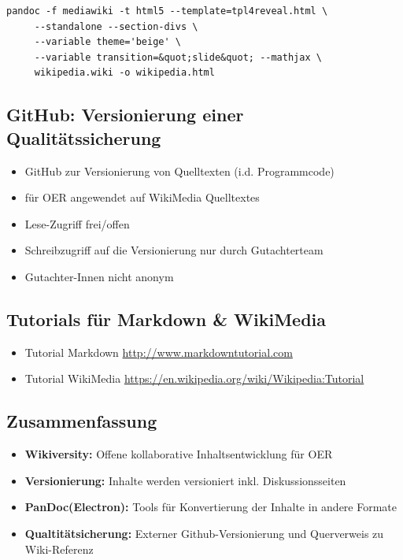 \documentclass[]{article}
\providecommand{\tightlist}{%
  \setlength{\itemsep}{0pt}\setlength{\parskip}{0pt}}
\begin{document}
\begin{verbatim}
pandoc -f mediawiki -t html5 --template=tpl4reveal.html \
     --standalone --section-divs \
     --variable theme='beige' \
     --variable transition=&quot;slide&quot; --mathjax \
     wikipedia.wiki -o wikipedia.html
\end{verbatim}

\subsection{GitHub: Versionierung einer
Qualitätssicherung}\label{github-versionierung-einer-qualituxe4tssicherung}

\begin{itemize}
\tightlist
\item
  GitHub zur Versionierung von Quelltexten (i.d. Programmcode)
\item
  für OER angewendet auf WikiMedia Quelltextes
\item
  Lese-Zugriff frei/offen
\item
  Schreibzugriff auf die Versionierung nur durch Gutachterteam
\item
  Gutachter-Innen nicht anonym
\end{itemize}

\subsection{Tutorials für Markdown \&
WikiMedia}\label{tutorials-fuxfcr-markdown-wikimedia}

\begin{itemize}
\tightlist
\item
  Tutorial Markdown \url{http://www.markdowntutorial.com}
\item
  Tutorial WikiMedia
  \url{https://en.wikipedia.org/wiki/Wikipedia:Tutorial}
\end{itemize}

\subsection{Zusammenfassung}\label{zusammenfassung}

\begin{itemize}
\tightlist
\item
  \textbf{Wikiversity:} Offene kollaborative Inhaltsentwicklung für OER
\item
  \textbf{Versionierung:} Inhalte werden versioniert inkl.
  Diskussionsseiten
\item
  \textbf{PanDoc(Electron):} Tools für Konvertierung der Inhalte in
  andere Formate
\item
  \textbf{Qualtitätsicherung:} Externer Github-Versionierung und
  Querverweis zu Wiki-Referenz
\end{itemize}
\end{document}
